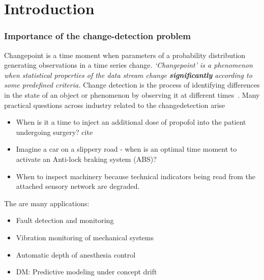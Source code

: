 \chapter{Introduction}


\subsection{Importance of the change-detection problem}
Changepoint is a time moment when parameters of a probability distribution generating observations in a time series change.
\textit{`Changepoint' is a phenomenon when statistical properties of the data stream change \textbf{significantly} according to some predefined criteria.}
%    
Change detection is the process of identifying differences in the state of an object or phenomenon by observing it at different times~\cite{Singh1989}.
%
Many practical questions across industry related to the changedetection arise
\begin{itemize}
    \item When is it a time to inject an additional dose of propofol into the patient undergoing surgery? cite
    \item Imagine a car on a slippery road - when is an optimal time moment to activate an Anti-lock braking system (ABS)?
    \item When to inspect machinery because technical indicators being read from the attached sensory network are degraded.
\end{itemize}

The are many applications:
\begin{itemize}
    \item Fault detection and monitoring
    \item Vibration monitoring of mechanical systems
    \item Automatic depth of anesthesia control 
    \item DM: Predictive modeling under concept drift
\end{itemize}

